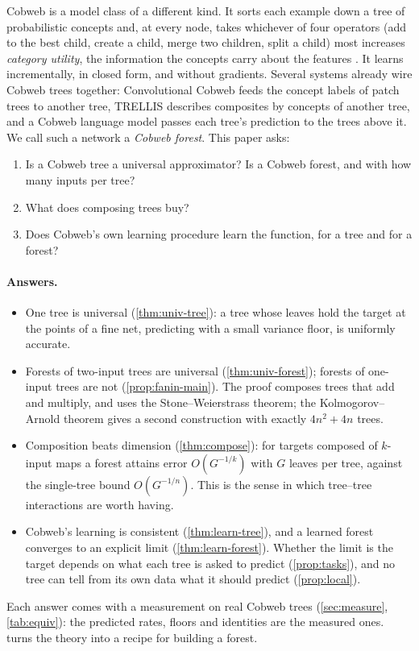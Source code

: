 Cobweb \citep{fisher1987} is a model class of a different kind.  It sorts each example
down a tree of probabilistic concepts and, at every node, takes whichever of four
operators (add to the best child, create a child, merge two children, split a child) most
increases \emph{category utility}, the information the concepts carry about the features
\citep{corter1992,maclellan2026rational}.  It learns incrementally, in closed form, and
without gradients.  Several systems already wire Cobweb trees together: Convolutional
Cobweb \citep{maclellan2021conv} feeds the concept labels of patch trees to another tree,
TRELLIS \citep{singaravadivelan2026trellis} describes composites by concepts of another
tree, and a Cobweb language model passes each tree's prediction to the trees above it.  We
call such a network a \emph{Cobweb forest}.  This paper asks:
\begin{enumerate}[label=\textbf{Q\arabic*.},leftmargin=*,noitemsep]
\item Is a Cobweb tree a universal approximator?  Is a Cobweb forest, and with how many
  inputs per tree?
\item What does composing trees buy?
\item Does Cobweb's own learning procedure learn the function, for a tree and for a forest?
\end{enumerate}

\paragraph{Answers.}
\begin{itemize}[leftmargin=*,noitemsep]
\item One tree is universal (\cref{thm:univ-tree}): a tree whose leaves hold the target at
  the points of a fine net, predicting with a small variance floor, is uniformly accurate.
\item Forests of two-input trees are universal (\cref{thm:univ-forest}); forests of
  one-input trees are not (\cref{prop:fanin-main}).  The proof composes trees that add and
  multiply, and uses the Stone--Weierstrass theorem; the Kolmogorov--Arnold theorem gives a
  second construction with exactly $4n^2+4n$ trees.
\item Composition beats dimension (\cref{thm:compose}): for targets composed of $k$-input
  maps a forest attains error $O(G^{-1/k})$ with $G$ leaves per tree, against the single-tree
  bound $O(G^{-1/n})$.  This is the sense in which tree--tree interactions are worth having.
\item Cobweb's learning is consistent (\cref{thm:learn-tree}), and a learned forest
  converges to an explicit limit (\cref{thm:learn-forest}).  Whether the limit is the target
  depends on what each tree is asked to predict (\cref{prop:tasks}), and no tree can tell from
  its own data what it should predict (\cref{prop:local}).
\end{itemize}
Each answer comes with a measurement on real Cobweb trees (\cref{sec:measure},
\cref{tab:equiv}): the predicted rates, floors and identities are the measured ones.
 turns the theory into a recipe for building a forest.

